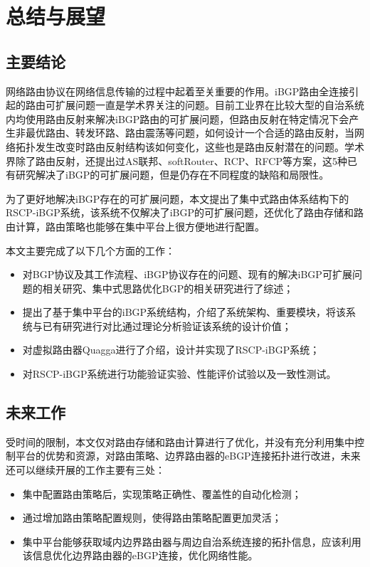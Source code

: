 \chapter{总结与展望}
\label{cha:summary}



\section{主要结论}
网络路由协议在网络信息传输的过程中起着至关重要的作用。iBGP路由全连接引起的路由可扩展问题一直是学术界关注的问题。目前工业界在比较大型的自治系统内均使用路由反射来解决iBGP路由的可扩展问题，但路由反射在特定情况下会产生非最优路由、转发环路、路由震荡等问题，如何设计一个合适的路由反射，当网络拓扑发生改变时路由反射结构该如何变化，这些也是路由反射潜在的问题。学术界除了路由反射，还提出过AS联邦、softRouter、RCP、RFCP等方案，这5种已有研究解决了iBGP的可扩展问题，但是仍存在不同程度的缺陷和局限性。

为了更好地解决iBGP存在的可扩展问题，本文提出了集中式路由体系结构下的RSCP-iBGP系统，该系统不仅解决了iBGP的可扩展问题，还优化了路由存储和路由计算，路由策略也能够在集中平台上很方便地进行配置。

本文主要完成了以下几个方面的工作：
\begin{itemize}
  \item 对BGP协议及其工作流程、iBGP协议存在的问题、现有的解决iBGP可扩展问题的相关研究、集中式思路优化BGP的相关研究进行了综述；
  \item 提出了基于集中平台的iBGP系统结构，介绍了系统架构、重要模块，将该系统与已有研究进行对比通过理论分析验证该系统的设计价值；
  \item 对虚拟路由器Quagga进行了介绍，设计并实现了RSCP-iBGP系统；
  \item 对RSCP-iBGP系统进行功能验证实验、性能评价试验以及一致性测试。
\end{itemize}


\section{未来工作}

受时间的限制，本文仅对路由存储和路由计算进行了优化，并没有充分利用集中控制平台的优势和资源，对路由策略、边界路由器的eBGP连接拓扑进行改进，未来还可以继续开展的工作主要有三处：

\begin{itemize}
  \item 集中配置路由策略后，实现策略正确性、覆盖性的自动化检测；
  \item 通过增加路由策略配置规则，使得路由策略配置更加灵活；
  \item 集中平台能够获取域内边界路由器与周边自治系统连接的拓扑信息，应该利用该信息优化边界路由器的eBGP连接，优化网络性能。
\end{itemize}